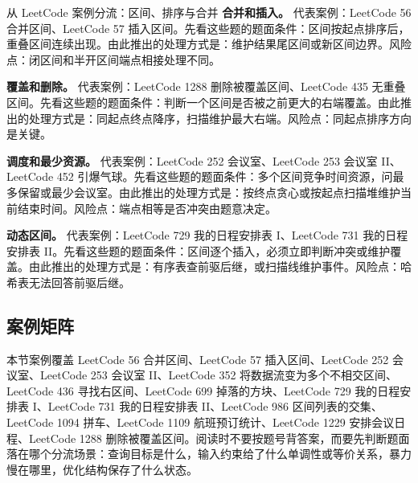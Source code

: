 \begin{principlebox}{从 LeetCode 案例分流：区间、排序与合并}
\textbf{合并和插入。}
代表案例：LeetCode 56 合并区间、LeetCode 57 插入区间。先看这些题的题面条件：区间按起点排序后，重叠区间连续出现。由此推出的处理方式是：维护结果尾区间或新区间边界。风险点：闭区间和半开区间端点相接处理不同。

\textbf{覆盖和删除。}
代表案例：LeetCode 1288 删除被覆盖区间、LeetCode 435 无重叠区间。先看这些题的题面条件：判断一个区间是否被之前更大的右端覆盖。由此推出的处理方式是：同起点终点降序，扫描维护最大右端。风险点：同起点排序方向是关键。

\textbf{调度和最少资源。}
代表案例：LeetCode 252 会议室、LeetCode 253 会议室 II、LeetCode 452 引爆气球。先看这些题的题面条件：多个区间竞争时间资源，问最多保留或最少会议室。由此推出的处理方式是：按终点贪心或按起点扫描堆维护当前结束时间。风险点：端点相等是否冲突由题意决定。

\textbf{动态区间。}
代表案例：LeetCode 729 我的日程安排表 I、LeetCode 731 我的日程安排表 II。先看这些题的题面条件：区间逐个插入，必须立即判断冲突或维护覆盖。由此推出的处理方式是：有序表查前驱后继，或扫描线维护事件。风险点：哈希表无法回答前驱后继。

\end{principlebox}

\subsection{案例矩阵}

本节案例覆盖 LeetCode 56 合并区间、LeetCode 57 插入区间、LeetCode 252 会议室、LeetCode 253 会议室 II、LeetCode 352 将数据流变为多个不相交区间、LeetCode 436 寻找右区间、LeetCode 699 掉落的方块、LeetCode 729 我的日程安排表 I、LeetCode 731 我的日程安排表 II、LeetCode 986 区间列表的交集、LeetCode 1094 拼车、LeetCode 1109 航班预订统计、LeetCode 1229 安排会议日程、LeetCode 1288 删除被覆盖区间。阅读时不要按题号背答案，而要先判断题面落在哪个分流场景：查询目标是什么，输入约束给了什么单调性或等价关系，暴力慢在哪里，优化结构保存了什么状态。

